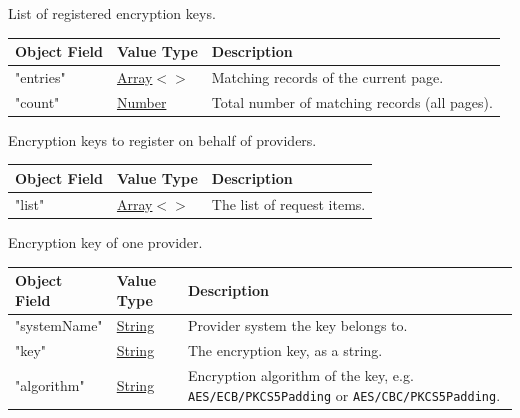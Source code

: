 \documentclass[a4paper]{arrowhead}
\newcommand{\mref}[2][]{{\textcolor{ArrowheadPurple}{\hyperref[sec:model:#2]{\ifstrempty{#1}{#2}{#1}}}}}
\newcommand{\pref}[1]{{\textcolor{ArrowheadGrey}{\hyperref[sec:model:primitives:#1]{#1}}}}
\begin{document}

List of registered encryption keys.


\noindent\begin{tabularx}{\textwidth}{| >{\raggedright\arraybackslash}p{3.9cm} | >{\raggedright\arraybackslash\small}p{5.3cm} | X |} \hline
\rowcolor{gray!33} Object Field & Value Type & Description \\ \hline
"entries" & \pref{Array}$<$\allowbreak{}\mref[Authorization\allowbreak{}Mgmt\allowbreak{}Encryption\allowbreak{}Key\allowbreak{}Response]{AuthorizationMgmtEncryptionKeyResponse}$>$ & Matching records of the current page. \\ \hline
"count" & \pref{Number} & Total number of matching records (all pages). \\ \hline
\end{tabularx}




Encryption keys to register on behalf of providers.


\noindent\begin{tabularx}{\textwidth}{| >{\raggedright\arraybackslash}p{3.9cm} | >{\raggedright\arraybackslash\small}p{5.3cm} | X |} \hline
\rowcolor{gray!33} Object Field & Value Type & Description \\ \hline
"list" & \pref{Array}$<$\allowbreak{}\mref[Authorization\allowbreak{}Mgmt\allowbreak{}Encryption\allowbreak{}Key\allowbreak{}Registration\allowbreak{}Request]{AuthorizationMgmtEncryptionKeyRegistrationRequest}$>$ & The list of request items. \\ \hline
\end{tabularx}




Encryption key of one provider.


\noindent\begin{tabularx}{\textwidth}{| >{\raggedright\arraybackslash}p{3.9cm} | >{\raggedright\arraybackslash\small}p{5.3cm} | X |} \hline
\rowcolor{gray!33} Object Field & Value Type & Description \\ \hline
"system\allowbreak{}Name" & \pref{String} & Provider system the key belongs to. \\ \hline
"key" & \pref{String} & The encryption key, as a string. \\ \hline
"algorithm" & \pref{String} & Encryption algorithm of the key, e.g. \texttt{AES/\allowbreak{}ECB/\allowbreak{}PKCS5Padding} or \texttt{AES/\allowbreak{}CBC/\allowbreak{}PKCS5Padding}. \\ \hline
\end{tabularx}
\end{document}
